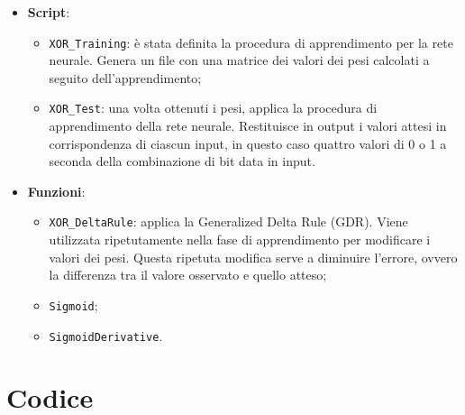 \documentclass[a4paper,12pt]{article}
\begin{document}
\begin{itemize}
    \item \textbf{Script}:
    \begin{itemize}
        \item \texttt{XOR\_Training}: è stata definita la procedura di apprendimento per la rete neurale. Genera un file con una matrice dei valori dei pesi calcolati a seguito dell'apprendimento;
        \item \texttt{XOR\_Test}: una volta ottenuti i pesi, applica la procedura di apprendimento della rete neurale. Restituisce in output i valori attesi in corrispondenza di ciascun input, in questo caso quattro valori di 0 o 1 a seconda della combinazione di bit data in input.
    \end{itemize}

    \item \textbf{Funzioni}:
    \begin{itemize}
        \item \texttt{XOR\_DeltaRule}: applica la Generalized Delta Rule (GDR). Viene utilizzata ripetutamente nella fase di apprendimento per modificare i valori dei pesi. Questa ripetuta modifica serve a diminuire l'errore, ovvero la differenza tra il valore osservato e quello atteso;
        \item \texttt{Sigmoid};
        \item \texttt{SigmoidDerivative}.
    \end{itemize}
\end{itemize}



\newpage
\section{Codice}
\end{document}
